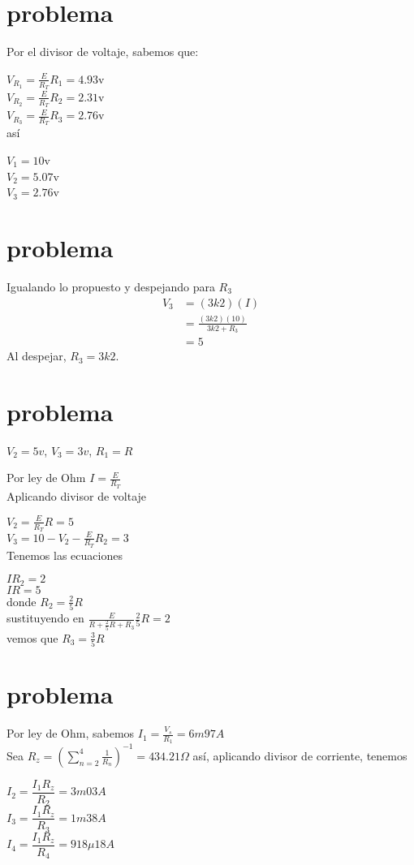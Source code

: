 \documentclass[12pt,letterpaper]{article}
\begin{document}
\section{problema}
	Por el divisor de voltaje, sabemos que:

	$V_{R_1} = \displaystyle \frac{E}{R_T}R_1 = 4.93$v \\
	$V_{R_2} = \displaystyle \frac{E}{R_T}R_2 = 2.31$v \\
	$V_{R_3} = \displaystyle \frac{E}{R_T}R_3 = 2.76$v\\

	así

	$V_1 = 10$v \\
	$V_2 = 5.07$v \\
	$V_3 = 2.76$v \\

\section{problema}

	Igualando lo propuesto y despejando para $R_3$
	\begin{align*}		
		V_3 &= (3k2) (I) \\
			&= \frac{(3k2)(10)}{3k2 + R_3} \\
			&= 5
	\end{align*}	
	Al despejar, $R_3 = 3k2$.	

\section{problema}
	
	$V_2 = 5v$, $V_3 = 3v$, $R_1 = R$

	Por ley de Ohm
	$I = \displaystyle \frac{E}{R_T}$ \\
	Aplicando divisor de voltaje

	$V_2 = \displaystyle \frac{E}{R_T}R = 5$ \\
	$V_3 = 10 - V_2 - \displaystyle \frac{E}{R_T}R_2 = 3$ \\

	Tenemos las ecuaciones

	$IR_2 = 2$ \\
	$IR = 5$ \\
	donde
	$R_2 = \displaystyle \frac{2}{5}R$ \\
	sustituyendo en
	$\displaystyle \frac{E}{R + \displaystyle \frac{2}{5}R + R_3} \displaystyle \frac{2}{5} R= 2$ \\ 
	vemos que $R_3 = \displaystyle \frac{3}{5} R$

\section {problema}
	Por ley de Ohm, sabemos
	$I_1 = \displaystyle \frac{V_s}{R_1} = 6m97A$ \\
	Sea $R_z = \left(\displaystyle\sum_{n=2}^{4} \frac{1}{R_n}\right)^{-1} = 434.21 \Omega $
	así, aplicando divisor de corriente, tenemos 

	$I_2 = \dfrac{I_1R_z}{R_2} = 3m03 A$ \\
	$I_3 = \dfrac{I_1R_z}{R_3} = 1m38 A$ \\
	$I_4 = \dfrac{I_1R_z}{R_4} = 918\mu18 A$
\end{document}
